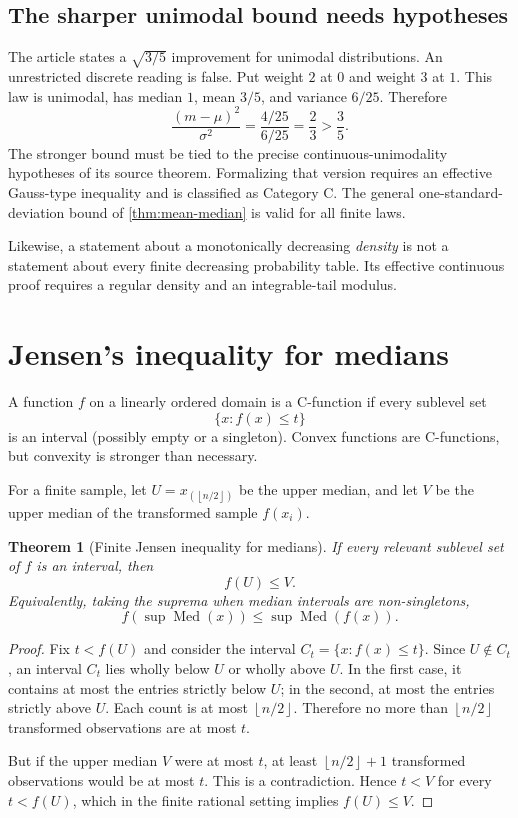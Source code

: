 \documentclass[11pt]{article}
\newtheorem{theorem}{Theorem}[section]
\newcommand{\Med}{\operatorname{Med}}
\newcommand{\floor}[1]{\left\lfloor#1\right\rfloor}
\begin{document}
\subsection{The sharper unimodal bound needs hypotheses}

The article states a $\sqrt{3/5}$ improvement for unimodal distributions.  An
unrestricted discrete reading is false.  Put weight $2$ at $0$ and weight $3$
at $1$.  This law is unimodal, has median $1$, mean $3/5$, and variance
$6/25$.  Therefore
\[
 \frac{(m-\mu)^2}{\sigma^2}
 =\frac{4/25}{6/25}=\frac23>\frac35.
\]
The stronger bound must be tied to the precise continuous-unimodality
hypotheses of its source theorem.  Formalizing that version requires an
effective Gauss-type inequality and is classified as Category C.  The general
one-standard-deviation bound of \cref{thm:mean-median} is valid for all finite
laws.

Likewise, a statement about a monotonically decreasing \emph{density} is not
a statement about every finite decreasing probability table.  Its effective
continuous proof requires a regular density and an integrable-tail modulus.

\section{Jensen's inequality for medians}

A function $f$ on a linearly ordered domain is a C-function if every sublevel
set
\[
  \{x:f(x)\leq t\}
\]
is an interval (possibly empty or a singleton).  Convex functions are
C-functions, but convexity is stronger than necessary.

For a finite sample, let $U=x_{(\floor{n/2})}$ be the upper median, and let
$V$ be the upper median of the transformed sample $f(x_i)$.

\begin{theorem}[Finite Jensen inequality for medians]\label{thm:jensen-median}
If every relevant sublevel set of $f$ is an interval, then
\[
  f(U)\leq V.
\]
Equivalently, taking the suprema when median intervals are non-singletons,
\[
 f(\sup\Med(x))\leq \sup\Med(f(x)).
\]
\end{theorem}

\begin{proof}
Fix $t<f(U)$ and consider the interval
$C_t=\{x:f(x)\leq t\}$.  Since $U\notin C_t$, an interval $C_t$ lies wholly
below $U$ or wholly above $U$.  In the first case, it contains at most the
entries strictly below $U$; in the second, at most the entries strictly above
$U$.  Each count is at most $\floor{n/2}$.  Therefore no more than
$\floor{n/2}$ transformed observations are at most $t$.

But if the upper median $V$ were at most $t$, at least
$\floor{n/2}+1$ transformed observations would be at most $t$.  This is a
contradiction.  Hence $t<V$ for every $t<f(U)$, which in the finite rational
setting implies $f(U)\leq V$.
\end{proof}
\end{document}
